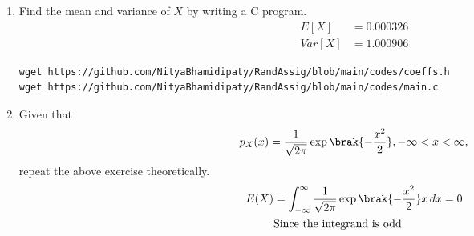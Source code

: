 \documentclass[journal,12pt,twocolumn]{IEEEtran}
\renewcommand\thesection{\arabic{section}}
\begin{document}
\begin{enumerate}[label=\thesection.\arabic*
,ref=\thesection.\theenumi]
\solution The PDF of $X$ (\ref{fig:gau_pdf})is plotted using the code below:
\begin{lstlisting}
wget https://github.com/NityaBhamidipaty/RandAssig/blob/main/codes/pdf_plot.py
\end{lstlisting}
\begin{figure}[h]
    \centering
    \texttt{[image: gauss\_pdf.pdf]}
    \caption{PDF of $X$}
    \label{fig:gau_pdf}
\end{figure}
Properties of PDF
\begin{enumerate}
    \item $x\rightarrow{-\infty}\text{        } f_U(x) \rightarrow{0}$
    \item $x\rightarrow{\infty}\text{        } f_U(x) \rightarrow{0}$
    \item $f_U(x)$ is non-negative.
\end{enumerate}
\item Find the mean and variance of $X$ by writing a C program.\\
\solution
\begin{align}
    E[X] &= 0.000326\\
Var[X] &= 1.000906
\end{align}
\begin{lstlisting}
wget https://github.com/NityaBhamidipaty/RandAssig/blob/main/codes/coeffs.h
wget https://github.com/NityaBhamidipaty/RandAssig/blob/main/codes/main.c
\end{lstlisting}
\item Given that 
\begin{align}
p_{X}(x) = \frac{1}{\sqrt{2\pi}}\exp\brak{-\frac{x^2}{2}}, -\infty < x < \infty,
\end{align}
repeat the above exercise theoretically.\\
\solution
\begin{align}
    E(X) &= \int_{-\infty}^{\infty}\frac{1}{\sqrt{2\pi}}\exp\brak{-\frac{x^2}{2}}x\,dx
     = 0 \\
     & \text{Since the integrand is odd}
\end{align}


\end{enumerate}
\end{document}
